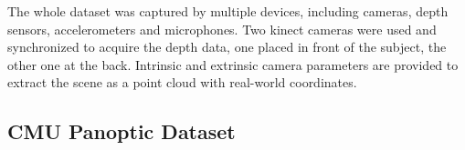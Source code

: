 
\noindent The whole dataset was captured by multiple devices, including cameras, depth sensors, accelerometers and microphones. Two kinect cameras were used and synchronized to acquire the depth data, one placed in front of the subject, the other one at the back. Intrinsic and extrinsic camera parameters are provided to extract the scene as a point cloud with real-world coordinates.\par

\subsection{CMU Panoptic Dataset}

